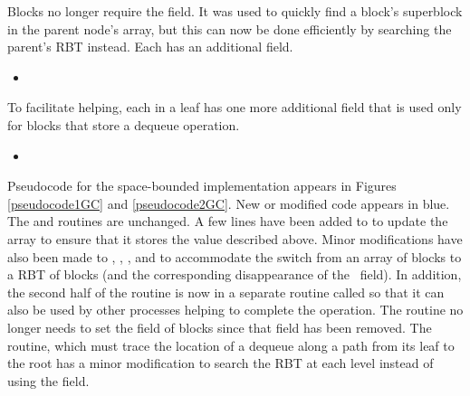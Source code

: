 Blocks no longer require the  field.  It was used to quickly find a block's 
superblock in the parent node's  array, but this can now be done efficiently 
by searching the parent's  RBT instead.
Each  has an additional field.
\begin{itemize}
\item {}  
\end{itemize}
To facilitate helping, each  in a leaf has one more additional field that is used only for blocks that store a dequeue operation.
\begin{itemize}
\item {}  
\end{itemize}


Pseudocode for the space-bounded implementation appears in Figures \ref{pseudocode1GC} and \ref{pseudocode2GC}.
New or modified code appears in blue.
The  and  routines are unchanged.
A few lines have been added to  to update the  array
to ensure that it stores the value described above.
Minor modifications have also
been made to , , ,  and 
to accommodate  the switch from an array of blocks to a RBT of blocks (and the corresponding disappearance
of the \head\ field).
In addition, the second half of the  routine is now in a
separate routine called  so that it can also be used by other processes
helping to complete the operation.
The  routine no longer needs to set the  field of blocks since
that field has been removed.
The  routine, which must trace the location of a dequeue along
a path from its leaf to the root has a minor modification to search the  RBT at 
each level instead of using the  field.


\renewcommand{\algorithmiccomment}[1]{\hfill\eqparbox{COMMENTDOUBLE}{\com\ #1}}

